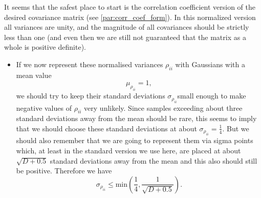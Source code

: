 It seems that the safest place to start is the correlation coefficient
version of the desired covariance matrix (see \ref{par:corr_coef_form}).
In this normalized version all variances are unity, and the magnitude
of all covariances should be strictly less than one (and even then
we are still not guaranteed that the matrix as a whole is positive
definite).
\begin{itemize}
\item If we now represent these normalised variances $\rho_{ii}$ with Gaussians
with a mean value
\begin{equation}
\mu_{\rho_{ii}}=1,
\end{equation}
 we should try to keep their standard deviations $\sigma_{\rho_{ii}}$small
enough to make negative values of $\rho_{ii}$ very unlikely. Since
samples exceeding about three standard deviations away from the mean
should be rare, this seems to imply that we should choose these standard
deviations at about $\sigma_{\rho_{ii}}=\frac{1}{4}$. But we should
also remember that we are going to represent them via sigma points
which, at least in the standard version we use here, are placed at
about $\sqrt{D+0.5}$ standard deviations away from the mean and this
also should still be positive. Therefore we have
\begin{equation}
\sigma_{\rho_{ii}}\leq\text{min}(\frac{1}{4},\frac{1}{\sqrt{D+0.5}}).
\end{equation}


\end{itemize}
